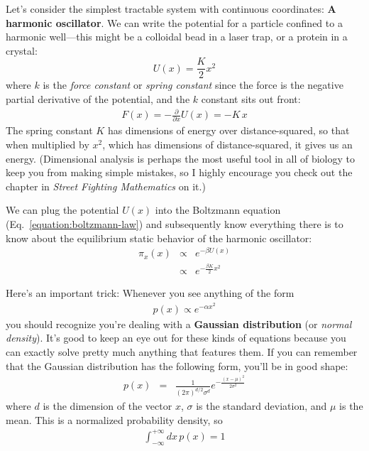 \documentclass[english,course]{lecture}
\begin{document}
Let's consider the simplest tractable system with continuous coordinates: {\bf A harmonic oscillator}.
We can write the potential for a particle confined to a harmonic well---this might be a colloidal bead in a laser trap, or a protein in a crystal:
\begin{equation}
U(x) = \frac{K}{2} x^2
\end{equation}
where $k$ is the \emph{force constant} or \emph{spring constant} since the force is the negative partial derivative of the potential, and the $k$ constant sits out front:
\begin{eqnarray}
F(x) = - \frac{\partial}{\partial x} U(x) = - K \, x
\end{eqnarray}
The spring constant $K$ has dimensions of energy over distance-squared, so that when multiplied by $x^2$, which has dimensions of distance-squared, it gives us an energy.
(Dimensional analysis is perhaps the most useful tool in all of biology to keep you from making simple mistakes, so I highly encourage you check out the chapter in \emph{Street Fighting Mathematics} on it.)

We can plug the potential $U(x)$ into the Boltzmann equation (Eq.~\ref{equation:boltzmann-law}) and subsequently know everything there is to know about the equilibrium static behavior of the harmonic oscillator:
\begin{eqnarray}
\pi_x(x) &\propto& e^{-\beta U(x)} \\
&\propto& e^{-\frac{\beta K}{2} x^2} \label{equation:harmonic-oscillator-boltzmann-law}
\end{eqnarray}

Here's an important trick: Whenever you see anything of the form
\begin{eqnarray}
p(x) \propto e^{-\alpha x^2}
\end{eqnarray}
you should recognize you're dealing with a {\bf Gaussian distribution} (or \emph{normal density}). 
It's good to keep an eye out for these kinds of equations because you can exactly solve pretty much anything that features them.
If you can remember that the Gaussian distribution has the following form, you'll be in good shape:
\begin{eqnarray}
p(x) &=& \frac{1}{(2 \pi)^{d/2} \sigma^d} e^{-\frac{(x - \mu)^2}{2 \sigma^2}}
\end{eqnarray}
where $d$ is the dimension of the vector $x$, $\sigma$ is the standard deviation, and $\mu$ is the mean.
This is a normalized probability density, so 
\begin{eqnarray}
\int_{-\infty}^{+\infty} dx \, p(x) = 1
\end{eqnarray}
\end{document}
